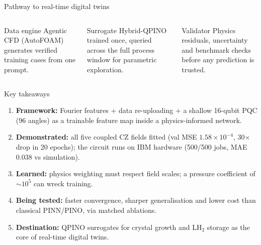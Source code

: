 \documentclass[aspectratio=169,10pt]{beamer}
\begin{document}
\begin{frame}{Pathway to real-time digital twins}
\centering
{}

\vspace{0.4cm}
\begin{columns}[T,onlytextwidth]
\begin{block}{Data engine}
\footnotesize Agentic CFD (AutoFOAM) generates verified training cases from one prompt.
\end{block}
\begin{block}{Surrogate}
\footnotesize Hybrid-QPINO trained once, queried across the full process window for parametric exploration.
\end{block}
\begin{block}{Validator}
\footnotesize Physics residuals, uncertainty and benchmark checks before any prediction is trusted.
\end{block}
\end{columns}
\end{frame}

\begin{frame}{Key takeaways}
\begin{enumerate}\setlength{\itemsep}{5pt}
  \item \textbf{Framework:} Fourier features + data re-uploading + a shallow 16-qubit PQC (96 angles) as a trainable feature map inside a physics-informed network.
  \item \textbf{Demonstrated:} all five coupled CZ fields fitted (val MSE $1.58\times10^{-4}$, 30$\times$ drop in 20 epochs); the circuit runs on IBM hardware (500/500 jobs, MAE 0.038 vs simulation).
  \item \textbf{Learned:} physics weighting must respect field scales; a pressure coefficient of $\sim\!10^5$ can wreck training.
  \item \textbf{Being tested:} faster convergence, sharper generalisation and lower cost than classical PINN/PINO, via matched ablations.
  \item \textbf{Destination:} QPINO surrogates for crystal growth and LH$_2$ storage as the core of real-time digital twins.
\end{enumerate}
\end{frame}
\end{document}
